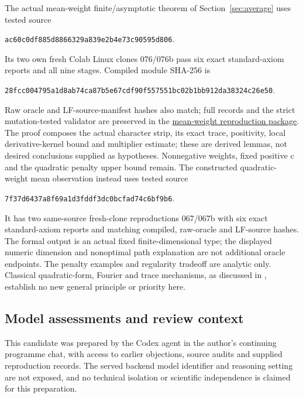 \documentclass[11pt]{article}
\begin{document}
The actual mean-weight finite/asymptotic theorem of Section~\ref{sec:average}
uses tested source
\begin{center}\small\texttt{ac60c0df885d8866329a839e2b4e73c90595d806}.\end{center}
Its two own fresh Colab Linux clones 076/076b pass six exact standard-axiom
reports and all nine stages. Compiled module SHA-256 is
\begin{center}\small\texttt{28fcc004795a1d8ab74ca87b5e67cdf90f557551bc02b1bb912da38324c26e50}.\end{center}
Raw oracle and LF-source-manifest hashes also match; full records and the
strict mutation-tested validator are preserved in the
\href{https://github.com/lluiseriksson/THE-ERIKSSON-PROGRAMME/tree/c3f2b1d31e50b37e44d895e0b08ee834bd6af488/reproducibility/average-weight-rank-divergence-20261031}{mean-weight reproduction package}.
The proof composes the actual character strip, its exact trace, positivity,
local derivative-kernel bound and multiplier estimate; these are derived
lemmas, not desired conclusions supplied as hypotheses. Nonnegative
weights, fixed positive c and the quadratic penalty upper bound remain.
The constructed quadratic-weight mean observation instead uses tested source
\begin{center}\small\texttt{7f37d6437a8f69a1d3fddf3dc0bcfad74c6bf9b6}.\end{center}
It has two same-source fresh-clone reproductions 067/067b with six exact
standard-axiom reports and matching compiled, raw-oracle and LF-source hashes.
The formal output is an actual fixed finite-dimensional type; the displayed
numeric dimension and nonoptimal path explanation are not additional oracle
endpoints. The penalty examples and regularity tradeoff are analytic only.
Classical quadratic-form, Fourier and trace mechanisms, as discussed in
\cite{spielman}, establish no new general principle or priority here.

\bigskip
\subsection*{Model assessments and review context}
This candidate was prepared by the Codex agent in the author's continuing
programme chat, with access to earlier objections, source audits and supplied
reproduction records. The served backend model identifier and reasoning
setting are not exposed, and no technical isolation or scientific independence
is claimed for this preparation.
\end{document}

